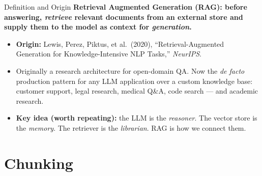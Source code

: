\begin{frame}{Definition and Origin}
\textbf{Retrieval Augmented Generation (RAG): before answering, \emph{retrieve} relevant documents from an external store and supply them to the model as context for \emph{generation}.}

\medskip
\begin{itemize}
\item \textbf{Origin:} Lewis, Perez, Piktus, et al.\ (2020), ``Retrieval-Augmented Generation for Knowledge-Intensive NLP Tasks,'' \emph{NeurIPS}.

\medskip
\item Originally a research architecture for open-domain QA. Now the \emph{de facto} production pattern for any LLM application over a custom knowledge base: customer support, legal research, medical Q\&A, code search --- and academic research.

\medskip
\item \textbf{Key idea (worth repeating):} the LLM is the \emph{reasoner}. The vector store is the \emph{memory}. The retriever is the \emph{librarian}. RAG is how we connect them.
\end{itemize}
\end{frame}

\section{Chunking}

